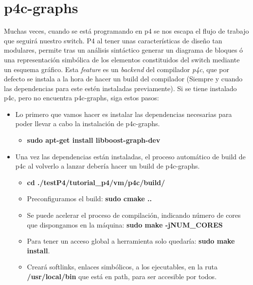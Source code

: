 \section{p4c-graphs}
Muchas veces, cuando se está programando en p4 se nos escapa el flujo de trabajo que seguirá nuestro switch. P4 al tener unas características de diseño tan modulares, permite tras un análisis sintáctico generar un diagrama de bloques ó una representación simbólica de los elementos constituidos del switch mediante un esquema gráfico. Esta \textit{feature} es un \textit{backend} del compilador \textit{p4c}, que por defecto se instala a la hora de hacer un build del compilador (Siempre y cuando las dependencias para este estén instaladas previamente).\newline
\newline
Si se tiene instalado p4c, pero no encuentra p4c-graphs, siga estos pasos:
\begin{itemize}
    \item Lo primero que vamos hacer es instalar las dependencias necesarias para poder llevar a cabo la instalación de p4c-graphs.
        \begin{itemize}
            \item \textbf{sudo apt-get install libboost-graph-dev}
        \end{itemize}
    \item Una vez las dependencias están instaladas, el proceso automático de build de p4c al volverlo a lanzar debería hacer un build de p4c-graphs.
        \begin{itemize}
            \item \textbf{cd ./testP4/tutorial\_p4/vm/p4c/build/}
            \item Preconfiguramos el build: \textbf{sudo cmake ..}
            \item Se puede acelerar el proceso de compilación, indicando número de cores que dispongamos en la máquina: \textbf{sudo make -jNUM\_CORES}
            \item Para tener un acceso global a herramienta solo quedaría: \textbf{sudo make install}.
            \item Creará softlinks, enlaces simbólicos, a los ejecutables, en la ruta \textbf{/usr/local/bin} que está en path, para ser accesible por todos.
        \end{itemize}
\end{itemize}
